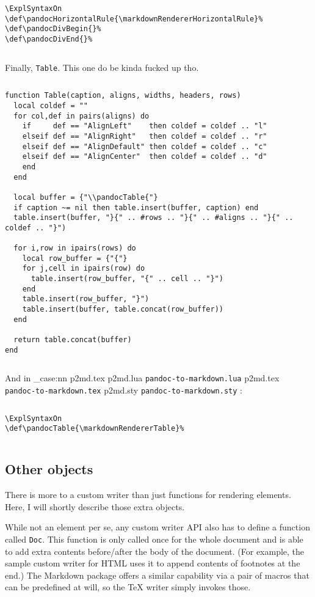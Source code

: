 \documentclass[
  digital,     %
  oneside,     %
  nosansbold,  %
  nocolorbold, %
  lof,         %
  nolot,       %
]{fithesis4}
\newcommand\file[1]
  {
    \str_case:nn
      { #1 }
      {
        { p2md.lua } { \texttt{pandoc\hyp{}to\hyp{}markdown.lua} }
        { p2md.tex } { \texttt{pandoc\hyp{}to\hyp{}markdown.tex} }
        { p2md.sty } { \texttt{pandoc\hyp{}to\hyp{}markdown.sty} }
      }
  }
\begin{document}
$ $

\noindent
\lstset{language=[plain]TeX}
\begin{lstlisting}
\ExplSyntaxOn
\def\pandocHorizontalRule{\markdownRendererHorizontalRule}%
\def\pandocDivBegin{}%
\def\pandocDivEnd{}%
\end{lstlisting}

$ $

\noindent
Finally, \texttt{Table}. This one do be kinda fucked up tho.

$ $

\noindent
\lstset{language=[5.3]Lua}
\begin{lstlisting}
function Table(caption, aligns, widths, headers, rows)
  local coldef = ""
  for col,def in pairs(aligns) do
    if     def == "AlignLeft"    then coldef = coldef .. "l"
    elseif def == "AlignRight"   then coldef = coldef .. "r"
    elseif def == "AlignDefault" then coldef = coldef .. "c"
    elseif def == "AlignCenter"  then coldef = coldef .. "d"
    end
  end

  local buffer = {"\\pandocTable{"}
  if caption ~= nil then table.insert(buffer, caption) end
  table.insert(buffer, "}{" .. #rows .. "}{" .. #aligns .. "}{" .. coldef .. "}")

  for i,row in ipairs(rows) do
    local row_buffer = {"{"}
    for j,cell in ipairs(row) do
      table.insert(row_buffer, "{" .. cell .. "}")
    end
    table.insert(row_buffer, "}")
    table.insert(buffer, table.concat(row_buffer))
  end

  return table.concat(buffer)
end
\end{lstlisting}

$ $

\noindent
And in \file{p2md.tex}:

$ $

\noindent
\lstset{language=[plain]TeX}
\begin{lstlisting}
\ExplSyntaxOn
\def\pandocTable{\markdownRendererTable}%
\end{lstlisting}

$ $

\subsection{Other objects}
There is more to a custom writer than just functions for rendering elements. Here, I will shortly describe those extra objects.

While not an element per se, any custom writer API also has to define a function called \texttt{Doc}. This function is only called once for the whole document and is able to add extra contents before/after the body of the document. (For example, the sample custom writer for HTML uses it to append contents of footnotes at the end.) The Markdown package offers a similar capability via a pair of macros that can be predefined at will, so the \TeX{} writer simply invokes those.
\end{document}
